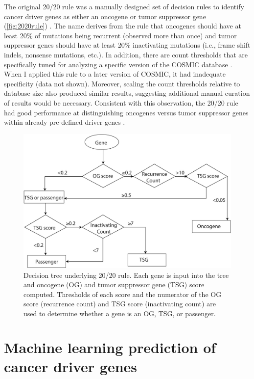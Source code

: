 The original 20/20 rule was a manually designed set of decision rules to identify cancer driver genes as either an oncogene or tumor suppressor gene (\autoref{fig:2020rule}) \cite{RN25}. The name derives from the rule that oncogenes should have at least 20\% of mutations being recurrent (observed more than once) and tumor suppressor genes should have at least 20\% inactivating mutations (i.e., frame shift indels, nonsense mutations, etc.). In addition, there are count thresholds that are specifically tuned for analyzing a specific version of the COSMIC database \cite{RN95}. When I applied this rule to a later version of COSMIC, it had inadequate specificity (data not shown). Moreover, scaling the count thresholds relative to database size also produced similar results, suggesting additional manual curation of results would be necessary. Consistent with this observation, the 20/20 rule had good performance at distinguishing oncogenes versus tumor suppressor genes within already pre-defined driver genes \cite{RN88}.

\begin{figure}
  \centering
  \makeatletter
  \let\@currsize\normalsize
  \includegraphics[width=0.9\linewidth]{figures/chapter3/2020_rule.jpg}
  \caption[Decision tree underlying 20/20 rule.]{Decision tree underlying 20/20 rule. Each gene is input into the tree and oncogene (OG) and tumor suppressor gene (TSG) score computed. Thresholds of each score and the numerator of the OG score (recurrence count) and TSG score (inactivating count) are used to determine whether a gene is an OG, TSG, or passenger.}
  \label{fig:2020rule}
\end{figure}

\section{Machine learning prediction of cancer driver genes}

